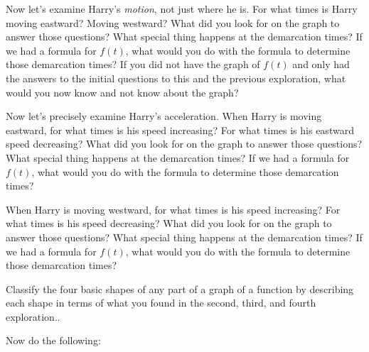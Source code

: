 \documentclass{ximera}
\begin{document}
\begin{exploration}
Now let’s examine Harry's {\em motion}, not just where he is.  For what times is Harry moving eastward?  Moving westward?  What did you look for on the graph to answer those questions?  What special thing happens at the demarcation times?  If we had a formula for $f(t)$, what would you do with the formula to determine those demarcation times?  If you did not have the graph of $f(t)$ and only had the answers to the initial questions to this and the previous exploration, what would you now know and not know about the graph?

\end{exploration}

\begin{exploration}
     Now let's precisely examine Harry's acceleration.  When Harry is moving eastward, for what times is his speed increasing?  For what times is his eastward speed decreasing?  What did you look for on the graph to answer those questions?  What special thing happens at the demarcation times?  If we had a formula for $f(t)$, what would you do with the formula to determine those demarcation times?          
\end{exploration}


\begin{exploration}
     When Harry is moving westward, for what times is his speed increasing?  For what times is his speed decreasing?  What did you look for on the graph to answer those questions?  What special thing happens at the demarcation times?  If we had a formula for $f(t)$, what would you do with the formula to determine those demarcation times?
\end{exploration}

\begin{exploration}
     Classify the four basic shapes of any part of a graph of a function by describing each shape in terms of what you found in the second, third, and fourth exploration..
\end{exploration}

Now do the following:
\end{document}
